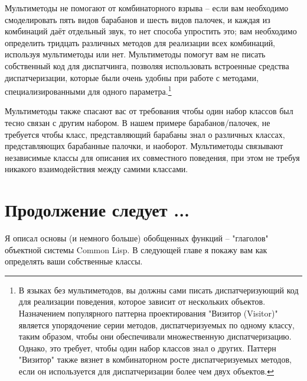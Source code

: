 Мультиметоды не помогают от комбинаторного взрыва -- если вам необходимо смоделировать
пять видов барабанов и шесть видов палочек, и каждая из комбинаций даёт отдельный звук, то
нет способа упростить это; вам необходимо определить тридцать различных методов для
реализации всех комбинаций, используя мультиметоды или нет.  Мультиметоды помогут вам не
писать собственный код для диспатчинга, позволяя использовать встроенные средства
диспатчеризации, которые были очень удобны при работе с методами, специализированными для
одного параметра.\footnote{В языках без мультиметодов, вы должны сами писать
  диспатчеризующий код для реализации поведения, которое зависит от нескольких объектов.
  Назначением популярного паттерна проектирования "Визитор (Visitor)" является
  упорядочение серии методов, диспатчеризуемых по одному классу, таким образом, чтобы они
  обеспечивали множественную диспатчеризацию.  Однако, это требует, чтобы один набор
  классов знал о других.  Паттерн "Визитор" также вязнет в комбинаторном росте
  диспатчеризуемых методов, если он используется для диспатчеризации более чем двух
  объектов.}

Мультиметоды также спасают вас от требования чтобы один набор классов был тесно связан с
другим набором. В нашем примере барабанов/палочек, не требуется чтобы класс,
представляющий барабаны знал о различных классах, представляющих барабанные палочки, и
наоборот.  Мультиметоды связывают независимые классы для описания их совместного
поведения, при этом не требуя никакого взаимодействия между самими классами.

\section{Продолжение следует ...}

Я описал основы (и немного больше) обобщенных функций -- "глаголов" объектной системы
Common Lisp.  В следующей главе я покажу вам как определять ваши собственные классы.

